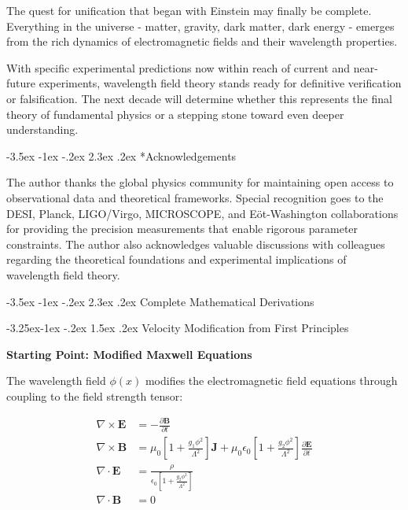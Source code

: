 \documentclass[10pt,twocolumn]{article}
\makeatletter
\renewcommand\section{\@startsection{section}{1}{\z@}%
  {-3.5ex \@plus -1ex \@minus -.2ex}%
  {2.3ex \@plus.2ex}%
  {\normalfont\large\bfseries}}
\renewcommand\subsection{\@startsection{subsection}{2}{\z@}%
  {-3.25ex\@plus -1ex \@minus -.2ex}%
  {1.5ex \@plus .2ex}%
  {\normalfont\normalsize\bfseries}}
\makeatother
\begin{document}
The quest for unification that began with Einstein may finally be complete. Everything in the universe - matter, gravity, dark matter, dark energy - emerges from the rich dynamics of electromagnetic fields and their wavelength properties.

With specific experimental predictions now within reach of current and near-future experiments, wavelength field theory stands ready for definitive verification or falsification. The next decade will determine whether this represents the final theory of fundamental physics or a stepping stone toward even deeper understanding.

\section*{Acknowledgements}

The author thanks the global physics community for maintaining open access to observational data and theoretical frameworks. Special recognition goes to the DESI, Planck, LIGO/Virgo, MICROSCOPE, and Eöt-Washington collaborations for providing the precision measurements that enable rigorous parameter constraints. The author also acknowledges valuable discussions with colleagues regarding the theoretical foundations and experimental implications of wavelength field theory.

\clearpage
\vfill
\newpage
\onecolumn

\section{Complete Mathematical Derivations}

\subsection{Velocity Modification from First Principles}

\textbf{Starting Point: Modified Maxwell Equations}

The wavelength field $\phi(x)$ modifies the electromagnetic field equations through coupling to the field strength tensor:

\begin{align}
\nabla \times \mathbf{E} &= -\frac{\partial \mathbf{B}}{\partial t} \\
\nabla \times \mathbf{B} &= \mu_0\left[1 + \frac{g_1\phi^2}{\Lambda^2}\right]\mathbf{J} + \mu_0\epsilon_0\left[1 + \frac{g_2\phi^2}{\Lambda^2}\right]\frac{\partial \mathbf{E}}{\partial t} \\
\nabla \cdot \mathbf{E} &= \frac{\rho}{\epsilon_0\left[1 + \frac{g_2\phi^2}{\Lambda^2}\right]} \\
\nabla \cdot \mathbf{B} &= 0
\end{align}
\end{document}
